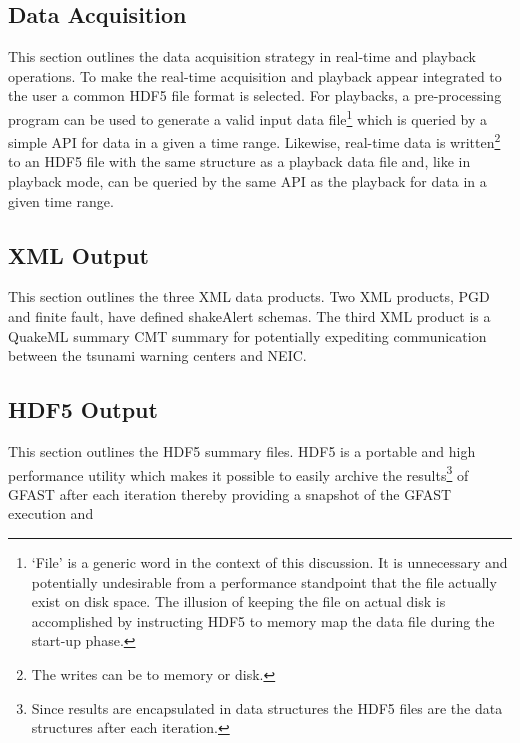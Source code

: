 \documentclass[12pt]{article}
\begin{document}
\clearpage
\subsection{Data Acquisition}
This section outlines the data acquisition strategy in real-time and playback operations.
To make the real-time acquisition and playback appear integrated to the user a common
HDF5 file format is selected.  For playbacks, a pre-processing program can be used to generate 
a valid input data 
file\footnote{`File' is a generic word in the context of this discussion.  
It is unnecessary and potentially undesirable from a performance standpoint that
the file actually exist on disk space.  The illusion of keeping the file on actual disk
is accomplished by instructing HDF5 to memory map the data file during the start-up phase.}
which is queried by a simple API for data in a given a time range.  
Likewise, real-time data is  
written\footnote{The writes can be to memory or disk.}
to an HDF5 file with the same structure as a playback data file and, like in playback mode,
can be queried by the same API as the playback for data in a given time range.

\clearpage
\subsection{XML Output}
This section outlines the three XML data products.  Two XML products, PGD and finite fault, have
defined shakeAlert schemas.  The third XML product is a QuakeML summary CMT summary for potentially
expediting communication between the tsunami warning centers and NEIC. 

\clearpage
\subsection{HDF5 Output}
This section outlines the HDF5 summary files.  HDF5 is a portable and high performance 
utility which makes it possible to easily archive the results\footnote{Since results are 
encapsulated in data structures the HDF5 files are the data structures after each iteration.}
of GFAST after each iteration thereby providing a snapshot of the GFAST execution and 
\end{document}
